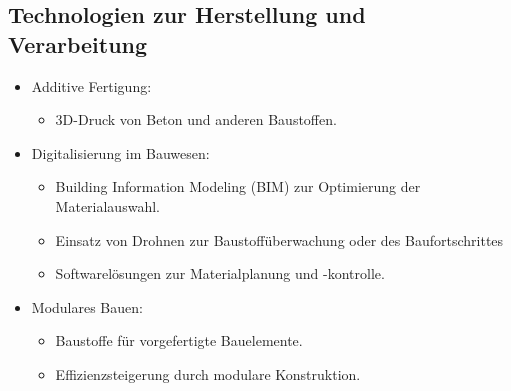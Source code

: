 \documentclass[
11pt,
captions=tableheading,
smallheadings,
headsepline,
footsepline, 
captions=tableheading,
parskip=half-,
]{scrartcl}
\begin{document}
\subsection{Technologien zur Herstellung und Verarbeitung}
\begin{itemize}
    \item Additive Fertigung:
          \begin{itemize}
              \item 3D-Druck von Beton und anderen Baustoffen.
          \end{itemize}
    \item Digitalisierung im Bauwesen:
          \begin{itemize}
              \item Building Information Modeling (BIM) zur Optimierung der Materialauswahl.
              \item Einsatz von Drohnen zur Baustoffüberwachung oder des Baufortschrittes
              \item Softwarelösungen zur Materialplanung und -kontrolle.
          \end{itemize}
    \item Modulares Bauen:
          \begin{itemize}
              \item Baustoffe für vorgefertigte Bauelemente.
              \item Effizienzsteigerung durch modulare Konstruktion.
          \end{itemize}
\end{itemize}
\end{document}

